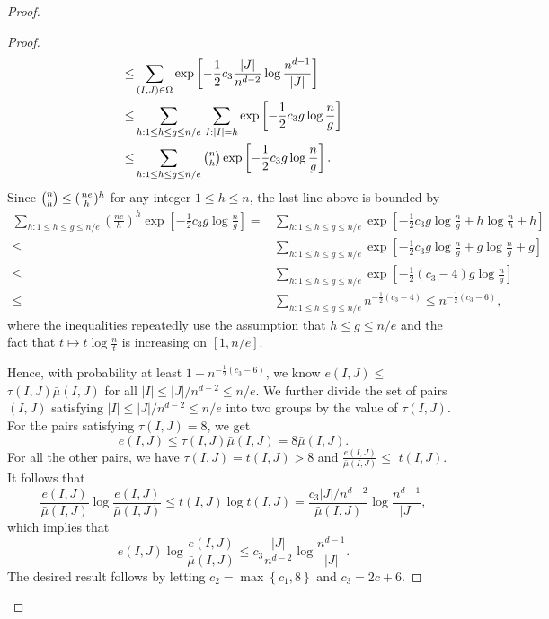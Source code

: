 \documentclass{article}
\theoremstyle{plain}
\theoremstyle{definition}
\theoremstyle{remark}
\begin{document}
\begin{appendix}
\begin{center}
\begin{proof}
\begin{proof}
\begin{align*}
					\leq & \sum_{(I,J)\in \Omega} \exp \left[-\frac{1}{2} c_3\frac{|J|}{n^{d-2}} \log \frac{n^{d-1}}{|J|}\right] \\
					\leq & \sum_{h: 1 \leq h \leq g \leq n / e} \,\sum_{I:|I|=h} \exp \left[-\frac{1}{2} c_3 g \log \frac{n}{g}\right] \\
					\leq &\sum_{h: 1 \leq h \leq g \leq n / e} \tbinom{n}{h} \exp \left[-\frac{1}{2} c_3 g \log \frac{n}{g}\right].
				\end{align*}
				Since $\tbinom{n}{h} \leq (\frac{ne}{h})^h$ for any integer $1\leq h \leq n$, the last line above is bounded by
				\begin{align*}
					\sum_{h: 1 \leq h \leq g \leq n / e}\left(\frac{n e}{h}\right)^h \exp \left[-\frac{1}{2} c_3 g \log \frac{n}{g}\right]
					=& \sum_{h: 1 \leq h \leq g \leq n / e} \exp \left[-\frac{1}{2} c_3 g \log \frac{n}{g}+h \log \frac{n}{h}+h\right] \\
					\leq & \sum_{h: 1 \leq h \leq g \leq n / e} \exp \left[-\frac{1}{2} c_3 g \log \frac{n}{g}+g \log \frac{n}{g}+ g\right] \\
					\leq & \sum_{h: 1 \leq h \leq g \leq n / e} \exp \left[-\frac{1}{2}\left(c_3-4\right) g \log \frac{n}{g}\right] \\
					\leq & \sum_{h: 1 \leq h \leq g \leq n / e} n^{-\frac{1}{2}\left(c_3-4\right)} \leq n^{-\frac{1}{2} \left(c_3-6\right)},
				\end{align*}
				where the inequalities repeatedly use the assumption that $h \leq g \leq n / e$ and the fact that $t \mapsto t \log \frac{n}{t}$ is increasing on $[1, n / e]$.
				
				Hence, with probability at least $1-n^{-\frac{1}{2}\left(c_3-6\right)}$, we know $e(I, J) \leq$ $\tau(I, J) \bar{\mu}(I, J)$ for all $|I| \leq|J|/n^{d-2} \leq n /e$. We further divide the set of pairs $(I, J)$ satisfying $|I| \leq|J|/n^{d-2} \leq n / e$ into two groups by the value of $\tau(I, J)$. For the pairs satisfying $\tau(I,J)=8$, we get
				\begin{equation*}
					e(I, J) \leq \tau(I, J) \bar{\mu}(I, J)=8 \bar{\mu}(I, J).
				\end{equation*}
				For all the other pairs, we have $\tau(I, J)=t(I, J)>8$ and $\frac{e(I, J)}{\bar{\mu}(I, J)} \leq$ $t(I, J)$. It follows that
				$$
				\frac{e(I, J)}{\bar{\mu}(I, J)} \log \frac{e(I, J)}{\bar{\mu}(I, J)} \leq t(I, J) \log t(I, J)=\frac{c_3|J|/n^{d-2}}{\bar{\mu}(I, J)} \log \frac{n^{d-1}}{|J|},
				$$
				which implies that
				$$
				e(I, J) \log \frac{e(I, J)}{\bar{\mu}(I, J)} \leq c_3\frac{|J|}{n^{d-2}}  \log \frac{n^{d-1}}{|J|} .
				$$
				The desired result follows by letting $c_2=\max \left\{c_1, 8\right\}$ and $c_3=2 c+6$.
			\end{proof}
			

\end{proof}
\end{center}
\end{appendix}
\end{document}
